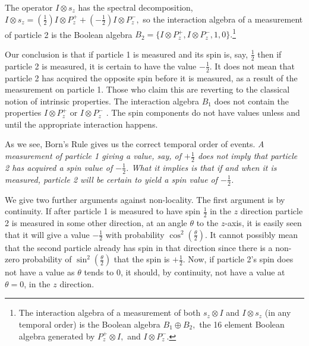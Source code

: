 \documentclass[12pt]{article}
\begin{document}
The operator $I\otimes s_z$  has the spectral decomposition, $I\otimes s_z =  (\frac{1}{2})I\otimes  P_z^+ + (-\frac{1}{2})I\otimes P_z^-,$ so the interaction algebra of a measurement of particle 2 is the Boolean algebra $B_2 = \{ I\otimes  P_z^+, I\otimes P_z^-, 1, 0\}.$\footnote{ The interaction algebra of a measurement of both $s_z\otimes I$ and $I\otimes s_z$ (in any temporal order) is the Boolean algebra $B_1\oplus  B_2,$ the 16 element  Boolean algebra generated by $P_z^+\otimes I,$  and  $I\otimes  P_z^-.$                                                                                                                                                                                                                                                                                                         }

Our conclusion is that if particle 1 is measured and its spin is, say, $\frac{1}{2}$ then if particle 2 is measured, it is certain to have the value $-\frac{1}{2}$. It does not mean that particle 2 has acquired the opposite spin before it is measured, as a result of the measurement on particle 1. Those who claim this are reverting to the classical notion of intrinsic properties. The interaction algebra $B_1$ does not contain the properties $I\otimes P_z^+$ or $I\otimes P_z^-$ . The spin components do not have values unless and until the appropriate interaction happens.                                                                                                                                            
    
As we see, Born's Rule gives us the correct temporal order of events. \emph{A measurement of particle 1 giving a value, say, of $+\frac{1}{2}$ does not imply that particle 2 has acquired a spin value  of $-\frac{1}{2}$. What it  implies is that if and when it is measured, particle 2 will be certain to yield a spin value of $-\frac{1}{2}$.   }


 We give two further arguments against non-locality. The first argument is by continuity. If after particle 1 is measured to have spin $\frac{1}{2}$ in the $z$ direction particle 2 is measured in some other direction, at an angle $\theta$ to the $z$-axis, it is easily seen that it will give a value $-\frac{1}{2}$ with probability $\cos^2{(\frac{\theta}{2})}$. It cannot possibly mean that the second particle already has spin in that direction since there is a non-zero probability of $\sin^2{(\frac{\theta}{2})}$ that the spin is $+\frac{1}{2}$. Now, if particle 2's spin does not have a value as $\theta$ tends to 0, it should, by continuity, not have a value at $\theta =  0$, in the $z$ direction.
\end{document}
